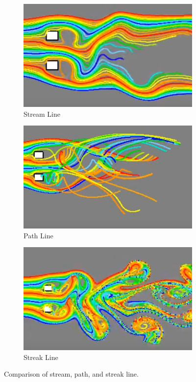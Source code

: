 \begin{figure}[H]
	\centering
	\begin{subfigure}{0.3\textwidth}	
		\centering
		\includegraphics[width=\linewidth]{Sketches/StreamLine}
		\caption{Stream Line}
		\label{fig:streamlines}
	\end{subfigure}
	\hfill
	\begin{subfigure}{0.3\textwidth}
		\centering
		\includegraphics[width=\linewidth]{Sketches/PathLine}
		\caption{Path Line}
		\label{fig:pathline}
	\end{subfigure}%
	\hfill
	\begin{subfigure}{0.3\textwidth}
		\centering
		\includegraphics[width=\linewidth]{Sketches/StreakLine}
		\caption{Streak Line}
		\label{fig:streakline}
	\end{subfigure}
	\caption{Comparison of stream, path, and streak line.}
\end{figure}

